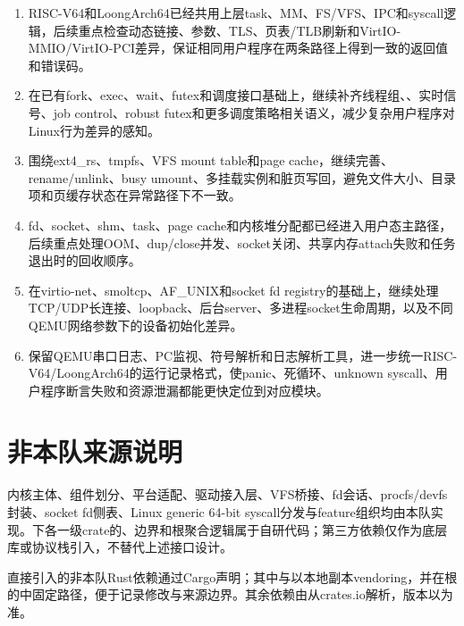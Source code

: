 \begin{enumerate}
  \item {}RISC-V64和LoongArch64已经共用上层task、MM、FS/VFS、IPC和syscall逻辑，后续重点检查动态链接、参数、TLS、页表/TLB刷新和VirtIO-MMIO/VirtIO-PCI差异，保证相同用户程序在两条路径上得到一致的返回值和错误码。
  \item {}在已有fork、exec、wait、futex和调度接口基础上，继续补齐线程组、、实时信号、job control、robust futex和更多调度策略相关语义，减少复杂用户程序对Linux行为差异的感知。
  \item {}围绕ext4\_rs、tmpfs、VFS mount table和page cache，继续完善、rename/unlink、busy umount、多挂载实例和脏页写回，避免文件大小、目录项和页缓存状态在异常路径下不一致。
  \item {}fd、socket、shm、task、page cache和内核堆分配都已经进入用户态主路径，后续重点处理OOM、dup/close并发、socket关闭、共享内存attach失败和任务退出时的回收顺序。
  \item {}在virtio-net、smoltcp、AF\_UNIX和socket fd registry的基础上，继续处理TCP/UDP长连接、loopback、后台server、多进程socket生命周期，以及不同QEMU网络参数下的设备初始化差异。
  \item {}保留QEMU串口日志、PC监视、符号解析和日志解析工具，进一步统一RISC-V64/LoongArch64的运行记录格式，使panic、死循环、unknown syscall、用户程序断言失败和资源泄漏都能更快定位到对应模块。
\end{enumerate}

\section{非本队来源说明}

\wateros{}内核主体、组件划分、平台适配、驱动接入层、VFS桥接、fd会话、procfs/devfs封装、socket fd侧表、Linux generic 64-bit syscall分发与feature组织均由本队实现。下各一级crate的、边界和根聚合逻辑属于自研代码；第三方依赖仅作为底层库或协议栈引入，不替代上述接口设计。

直接引入的非本队Rust依赖通过Cargo声明；其中与以本地副本vendoring，并在根的中固定路径，便于记录修改与来源边界。其余依赖由从crates.io解析，版本以为准。

